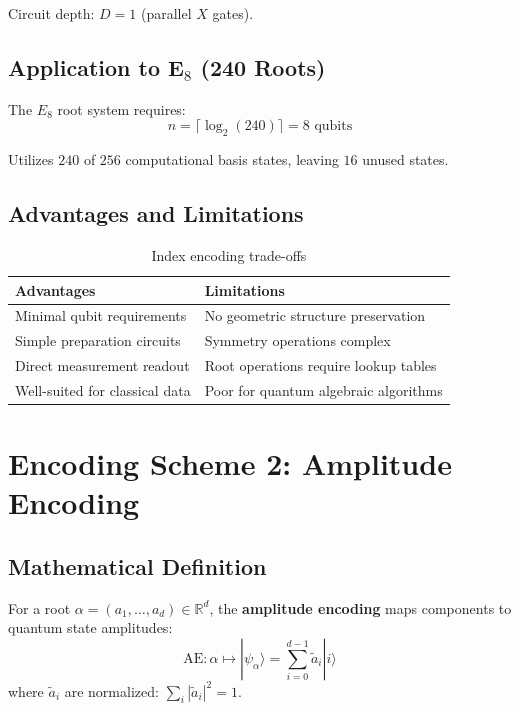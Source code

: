 Circuit depth: $D = 1$ (parallel $X$ gates).

\subsection{Application to E$_8$ (240 Roots)}

\begin{theorem}
\label{thm:e8_index_encoding}
The $E_8$ root system requires:
\begin{equation}
n = \lceil \log_2(240) \rceil = 8 \text{ qubits}
\end{equation}

Utilizes $240$ of $256$ computational basis states, leaving $16$ unused states.
\end{theorem}

\subsection{Advantages and Limitations}

\begin{table}[h]
\centering
\begin{tabular}{p{6cm}p{6cm}}
\toprule
\textbf{Advantages} & \textbf{Limitations} \\
\midrule
Minimal qubit requirements & No geometric structure preservation \\
Simple preparation circuits & Symmetry operations complex \\
Direct measurement readout & Root operations require lookup tables \\
Well-suited for classical data & Poor for quantum algebraic algorithms \\
\bottomrule
\end{tabular}
\caption{Index encoding trade-offs}
\label{tab:index_encoding_tradeoffs}
\end{table}

\section{Encoding Scheme 2: Amplitude Encoding}

\subsection{Mathematical Definition}

\begin{definition}
\label{def:amplitude_encoding}
For a root $\alpha = (a_1, \ldots, a_d) \in \mathbb{R}^d$, the \textbf{amplitude encoding} maps components to quantum state amplitudes:
\begin{equation}
\text{AE}: \alpha \mapsto |\psi_\alpha\rangle = \sum_{i=0}^{d-1} \tilde{a}_i |i\rangle
\end{equation}
where $\tilde{a}_i$ are normalized: $\sum_i |\tilde{a}_i|^2 = 1$.
\end{definition}

